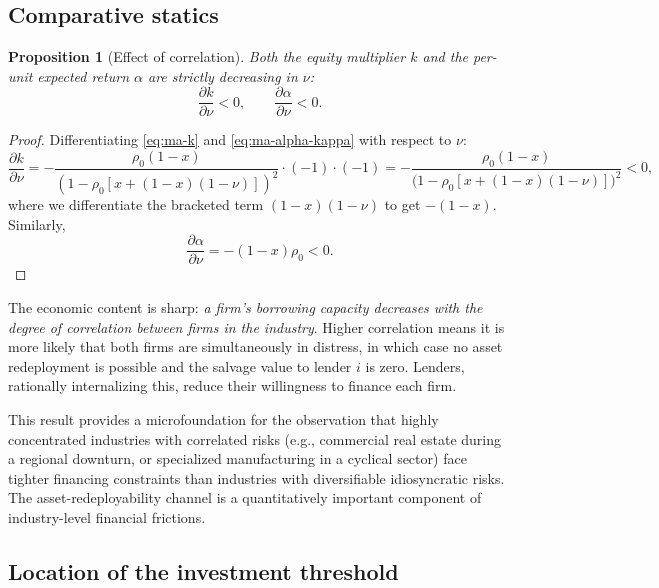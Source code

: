\documentclass[11pt,a4paper,oneside]{book}
\theoremstyle{plain}
\newtheorem{proposition}[theorem]{Proposition}
\theoremstyle{definition}
\theoremstyle{remark}
\numberwithin{equation}{chapter}
\begin{document}
\subsection{Comparative statics}

\begin{proposition}[Effect of correlation]\label{prop:ma-corr}
Both the equity multiplier $k$ and the per-unit expected return $\alpha$ are strictly decreasing in $\nu$:
\begin{equation*}
  \frac{\partial k}{\partial \nu} < 0,
  \qquad
  \frac{\partial \alpha}{\partial \nu} < 0.
\end{equation*}
\end{proposition}

\begin{proof}
Differentiating \eqref{eq:ma-k} and \eqref{eq:ma-alpha-kappa} with respect to $\nu$:
\begin{equation*}
  \frac{\partial k}{\partial \nu} = -\frac{\rho_0 (1 - x)}{(1 - \rho_0 [x + (1 - x)(1 - \nu)])^2} \cdot (-1) \cdot (-1) = -\frac{\rho_0 (1 - x)}{\bigl(1 - \rho_0 [x + (1 - x)(1 - \nu)]\bigr)^2} < 0,
\end{equation*}
where we differentiate the bracketed term $(1-x)(1-\nu)$ to get $-(1-x)$.
Similarly,
\begin{equation*}
  \frac{\partial \alpha}{\partial \nu} = -(1 - x) \rho_0 < 0.
\end{equation*}
\end{proof}

The economic content is sharp: \emph{a firm's borrowing capacity decreases with the degree of correlation between firms in the industry}.
Higher correlation means it is more likely that both firms are simultaneously in distress, in which case no asset redeployment is possible and the salvage value to lender $i$ is zero.
Lenders, rationally internalizing this, reduce their willingness to finance each firm.

This result provides a microfoundation for the observation that highly concentrated industries with correlated risks (e.g., commercial real estate during a regional downturn, or specialized manufacturing in a cyclical sector) face tighter financing constraints than industries with diversifiable idiosyncratic risks.
The asset-redeployability channel is a quantitatively important component of industry-level financial frictions.

\subsection{Location of the investment threshold}
\end{document}
